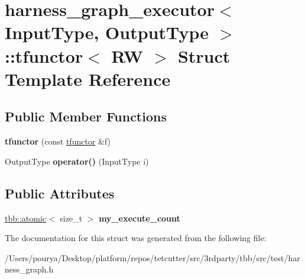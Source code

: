 \hypertarget{structharness__graph__executor_1_1tfunctor}{}\section{harness\+\_\+graph\+\_\+executor$<$ Input\+Type, Output\+Type $>$\+:\+:tfunctor$<$ R\+W $>$ Struct Template Reference}
\label{structharness__graph__executor_1_1tfunctor}
\subsection*{Public Member Functions}
\begin{DoxyCompactItemize}
\item 
\hypertarget{structharness__graph__executor_1_1tfunctor_ab87215127857893b709adbc5b7a9d012}{}{\bfseries tfunctor} (const \hyperlink{structharness__graph__executor_1_1tfunctor}{tfunctor} \&f)\label{structharness__graph__executor_1_1tfunctor_ab87215127857893b709adbc5b7a9d012}

\item 
\hypertarget{structharness__graph__executor_1_1tfunctor_a8f8531589bd48f864e8a363953c57e79}{}Output\+Type {\bfseries operator()} (Input\+Type i)\label{structharness__graph__executor_1_1tfunctor_a8f8531589bd48f864e8a363953c57e79}

\end{DoxyCompactItemize}
\subsection*{Public Attributes}
\begin{DoxyCompactItemize}
\item 
\hypertarget{structharness__graph__executor_1_1tfunctor_ae0984e13c97a8dba1d90c3181d264e45}{}\hyperlink{structtbb_1_1atomic}{tbb\+::atomic}$<$ size\+\_\+t $>$ {\bfseries my\+\_\+execute\+\_\+count}\label{structharness__graph__executor_1_1tfunctor_ae0984e13c97a8dba1d90c3181d264e45}

\end{DoxyCompactItemize}


The documentation for this struct was generated from the following file\+:\begin{DoxyCompactItemize}
\item 
/\+Users/pourya/\+Desktop/platform/repos/tetcutter/src/3rdparty/tbb/src/test/harness\+\_\+graph.\+h\end{DoxyCompactItemize}
